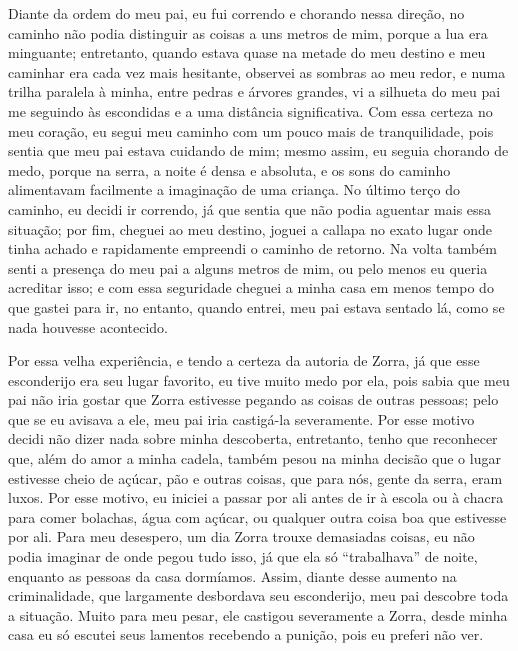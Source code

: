 Diante da ordem do meu pai, eu fui correndo e chorando nessa direção, no caminho não podia distinguir as coisas a uns metros de mim, porque a lua era minguante; entretanto, quando estava quase na metade do meu destino e meu caminhar era cada vez mais hesitante, observei as sombras ao meu redor, e numa trilha paralela à minha, entre pedras e árvores grandes, vi a silhueta do meu pai me seguindo às escondidas e a uma distância significativa.
Com essa certeza no meu coração, eu segui meu caminho com um pouco mais de tranquilidade, pois sentia que meu pai estava cuidando de mim; mesmo assim, eu seguia chorando de medo, porque na serra, a noite é densa e absoluta, e os sons do caminho alimentavam facilmente a imaginação de uma criança.
No último terço do caminho, eu decidi ir correndo, já que sentia que não podia aguentar mais essa situação; por fim, cheguei ao meu destino, joguei a callapa no exato lugar onde tinha achado e rapidamente empreendi o caminho de retorno.
Na volta também senti a presença do meu pai a alguns metros de mim, ou pelo menos eu queria acreditar isso; e com essa seguridade cheguei a minha casa em menos tempo do que gastei para ir, no entanto, quando entrei, meu pai estava sentado lá, como se nada houvesse acontecido.


Por essa velha experiência, e tendo a certeza da autoria de Zorra, já que esse esconderijo era seu lugar favorito, eu tive muito medo por ela, pois sabia que meu pai não iria gostar que Zorra estivesse pegando as coisas de outras pessoas; pelo que se eu avisava a ele, meu pai iria castigá-la severamente. Por esse motivo decidi não dizer nada sobre minha descoberta, entretanto, tenho que reconhecer que, além do amor a minha cadela, também pesou na minha decisão que o lugar estivesse cheio de açúcar, pão e outras coisas, que para nós, gente da serra, eram luxos. 
Por esse motivo, eu iniciei a passar por ali antes de ir à escola ou à chacra para comer bolachas, água com açúcar, ou qualquer outra coisa boa que estivesse por ali. 
Para meu desespero, um dia Zorra trouxe demasiadas coisas, eu  não podia imaginar de onde pegou tudo isso, já que ela só ``trabalhava'' de noite, enquanto as pessoas da casa dormíamos. Assim, diante desse aumento na criminalidade, que largamente desbordava seu esconderijo, meu pai descobre toda a situação.
Muito para meu pesar, ele castigou severamente a Zorra, desde minha casa eu só escutei seus lamentos recebendo a punição, pois eu preferi não ver.


